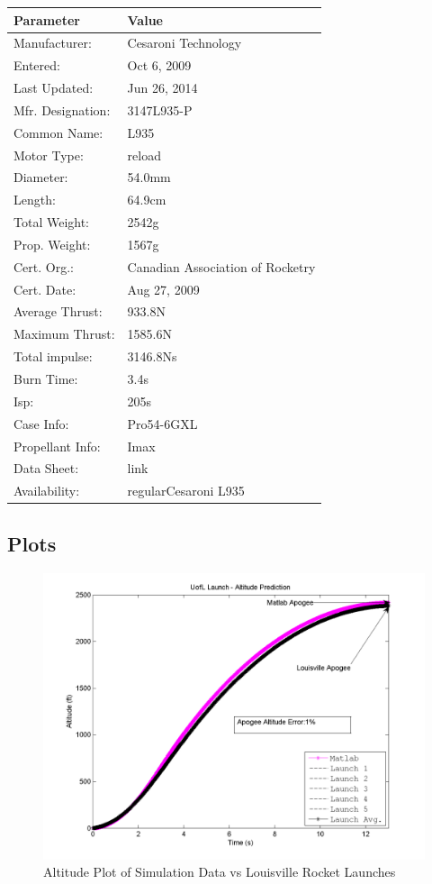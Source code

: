 \documentclass[]{article}
\begin{document}
\begin{longtable}[c]{@{}ll@{}}
\toprule
Parameter & Value\tabularnewline
\midrule
\endhead
Manufacturer: & Cesaroni Technology\tabularnewline
Entered: & Oct 6, 2009\tabularnewline
Last Updated: & Jun 26, 2014\tabularnewline
Mfr. Designation: & 3147L935-P\tabularnewline
Common Name: & L935\tabularnewline
Motor Type: & reload\tabularnewline
Diameter: & 54.0mm\tabularnewline
Length: & 64.9cm\tabularnewline
Total Weight: & 2542g\tabularnewline
Prop. Weight: & 1567g\tabularnewline
Cert. Org.: & Canadian Association of Rocketry\tabularnewline
Cert. Date: & Aug 27, 2009\tabularnewline
Average Thrust: & 933.8N\tabularnewline
Maximum Thrust: & 1585.6N\tabularnewline
Total impulse: & 3146.8Ns\tabularnewline
Burn Time: & 3.4s\tabularnewline
Isp: & 205s\tabularnewline
Case Info: & Pro54-6GXL\tabularnewline
Propellant Info: & Imax\tabularnewline
Data Sheet: & link\tabularnewline
Availability: & regularCesaroni L935\tabularnewline
\bottomrule
\end{longtable}

\clearpage

\subsection{Plots}\label{plots}

\begin{figure}[htbp]
\centering
\includegraphics{images/plots/plot_louisville_altitude_analysis.png}
\caption{Altitude Plot of Simulation Data vs Louisville Rocket Launches
\label{experimental_comparison_altitude_label}}
\end{figure}
\end{document}
